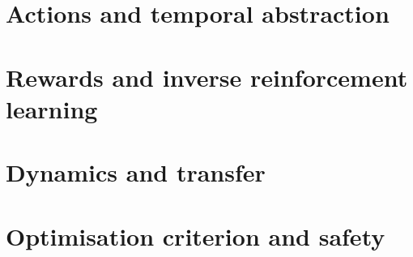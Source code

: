\section{Actions and temporal abstraction}
\section{Rewards and inverse reinforcement learning}
\section{Dynamics and transfer}
\section{Optimisation criterion and safety}
